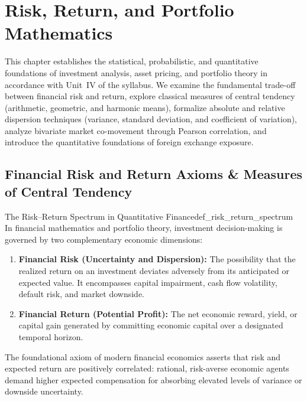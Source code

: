 
\chapter{Risk, Return, and Portfolio Mathematics}
\label{ch:risk_return_portfolio_mathematics}

This chapter establishes the statistical, probabilistic, and quantitative foundations of investment analysis, asset pricing, and portfolio theory in accordance with Unit~IV of the syllabus. We examine the fundamental trade-off between financial risk and return, explore classical measures of central tendency (arithmetic, geometric, and harmonic means), formalize absolute and relative dispersion techniques (variance, standard deviation, and coefficient of variation), analyze bivariate market co-movement through Pearson correlation, and introduce the quantitative foundations of foreign exchange exposure.

\section{Financial Risk and Return Axioms \& Measures of Central Tendency}

\begin{definition}{The Risk--Return Spectrum in Quantitative Finance}{def_risk_return_spectrum}
In financial mathematics and portfolio theory, investment decision-making is governed by two complementary economic dimensions:
\begin{enumerate}[leftmargin=*, topsep=2pt, itemsep=3pt]
    \item \textbf{Financial Risk (Uncertainty and Dispersion):} The possibility that the realized return on an investment deviates adversely from its anticipated or expected value. It encompasses capital impairment, cash flow volatility, default risk, and market downside.
    \item \textbf{Financial Return (Potential Profit):} The net economic reward, yield, or capital gain generated by committing economic capital over a designated temporal horizon.
\end{enumerate}
The foundational axiom of modern financial economics asserts that risk and expected return are positively correlated: rational, risk-averse economic agents demand higher expected compensation for absorbing elevated levels of variance or downside uncertainty.
\end{definition}


